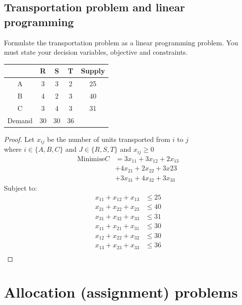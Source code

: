 \documentclass[a4paper]{article}
\begin{document}
\subsection{Transportation problem and linear programming}
\begin{eg}
	Formulate the transportation problem as a linear programming problem. You must state your decision variables, objective and constraints.
	\begin{center}
		\begin{tabular}{c|c|c|c|c}
			       & R  & S  & T  & Supply \\
			\hline
			A      & 3  & 3  & 2  & 25     \\
			\hline
			B      & 4  & 2  & 3  & 40     \\
			\hline
			C      & 3  & 4  & 3  & 31     \\
			\hline
			Demand & 30 & 30 & 36 &        \\
		\end{tabular}
	\end{center}
	\begin{proof}
		Let $x_{ij}$ be the number of units transported from $i$ to $j$\\
		where $i\in \{A,B,C\}$ and $J\in \{R,S,T\}$ and $x_{ij}\geq 0$\\
		\begin{align*}
			\text{Minimise} C & =3x_{11}+3x_{12}+2x_{13} \\
			                  & +4x_{21}+2x_{22}+3x{23}  \\
			                  & +3x_{31}+4x_{32}+3x_{33}
		\end{align*}
		Subject to:
		\begin{align*}
			x_{11}+x_{12}+x_{13} & \leq 25 \\
			x_{21}+x_{22}+x_{23} & \leq 40 \\
			x_{31}+x_{32}+x_{33} & \leq 31 \\
			x_{11}+x_{21}+x_{31} & \leq 30 \\
			x_{12}+x_{22}+x_{32} & \leq 30 \\
			x_{13}+x_{23}+x_{33} & \leq 36 \\
		\end{align*}
	\end{proof}
\end{eg}

\section{Allocation (assignment) problems}
\end{document}

